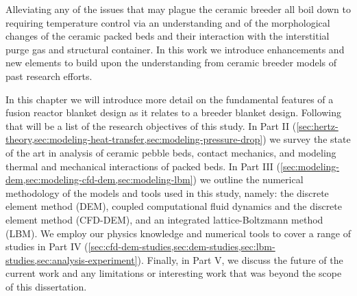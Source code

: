 Alleviating any of the issues that may plague the ceramic breeder all boil down to requiring temperature control via an understanding and of the morphological changes of the ceramic packed beds and their interaction with the interstitial purge gas and structural container. In this work we introduce enhancements and new elements to build upon the understanding from ceramic breeder models of past research efforts. 

In this chapter we will introduce more detail on the fundamental features of a fusion reactor blanket design as it relates to a breeder blanket design. Following that will be a list of the research objectives of this study. In Part II (\cref{sec:hertz-theory,sec:modeling-heat-transfer,sec:modeling-pressure-drop}) we survey the state of the art in analysis of ceramic pebble beds, contact mechanics, and modeling thermal and mechanical interactions of packed beds.  In Part III (\cref{sec:modeling-dem,sec:modeling-cfd-dem,sec:modeling-lbm}) we outline the numerical methodology of the models and tools used in this study, namely: the discrete element method (DEM), coupled computational fluid dynamics and the discrete element method (CFD-DEM), and an integrated lattice-Boltzmann method (LBM). We employ our physics knowledge and numerical tools to cover a range of studies in Part IV (\cref{sec:cfd-dem-studies,sec:dem-studies,sec:lbm-studies,sec:analysis-experiment}). Finally, in Part V, we discuss the future of the current work and any limitations or interesting work that was beyond the scope of this dissertation.



















